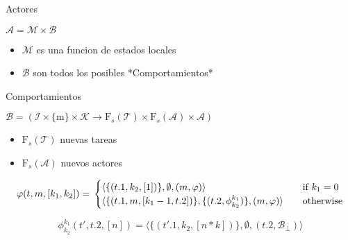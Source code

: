 \documentclass{beamer}
\begin{document}
\begin{frame}
   
  Actores
  \begin{center}
    \Huge $\mathcal{A} = \mathcal{M} \times \mathcal{B}$
  \end{center}
  
  \begin{itemize}
   

  \item $\mathcal{M}$ es una funcion de estados locales
  \item $\mathcal{B}$ son todos los posibles *Comportamientos*
    
  \end{itemize}

\end{frame}

\begin{frame}
   
  Comportamientos
  \begin{center}
    \Large $\mathcal{B} = ( \mathcal{I} \times \{\mathrm{m}\} \times \mathcal{K} \rightarrow \mathrm{F}_s(\mathcal{T}) \times \mathrm{F}_s(\mathcal{A}) \times \mathcal{A} ) $
  \end{center}
  
  \begin{itemize}
   

  \item $\mathrm{F}_s(\mathcal{T})$ nuevas tareas  
  \item $\mathrm{F}_s(\mathcal{A})$ nuevos actores
    
  \end{itemize}

\end{frame}

\begin{frame}

  
  \[ \varphi(t,m,[k_1,k_2]) = \\
  \begin{cases}
    \langle \{ (t.1, k_2, [1]) \}, \emptyset, (m, \varphi) \rangle                          & \quad \text{if } k_1 = 0\\
    \langle \{ (t.1, m, [k_1 - 1, t.2])\}, \{(t.2, \phi^{k_1}_{k_2})\}, (m, \varphi) \rangle  & \quad \text{otherwise}\\
  \end{cases}
  \]

  \[ \phi^{k_1}_{k_2}(t', t.2, [n]) = \langle \{(t'.1, k_2, [n * k])\}, \emptyset, (t.2, \mathcal{B}_\bot) \rangle \]
  
\end{frame}
\end{document}
